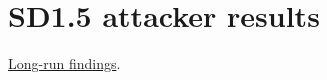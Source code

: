 \section{SD1.5 attacker
results}\label{record-docs-image-attacker-ablation-results-md-sd1.5-attacker-results}

\href{../results/research_workflow/image_dda/20261025T084419997575Z/summary.md}{Long-run
findings}.
